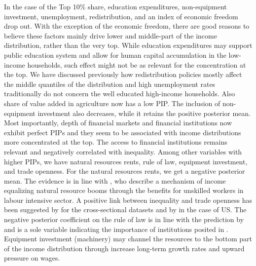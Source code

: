 \begin{refsection}
In the case of the Top 10\% share, education expenditures, non-equipment investment, unemployment, redistribution, and an index of economic freedom drop out. With the exception of the economic freedom, there are good reasons to believe these factors mainly drive lower and middle-part of the income distribution, rather than the very top. While education expenditures may support public education system and allow for human capital accumulation in the low-income households, such effect might not be as relevant for the concentration at the top. We have discussed previously how redistribution policies mostly affect the middle quantiles of the distribution and high unemployment rates traditionally do not concern the well educated high-income households. Also share of value added in agriculture now has a low \ac{PIP}. The inclusion of non-equipment investment also decreases, while it retains the positive posterior mean. Most importantly, depth of financial markets and financial institutions now exhibit perfect \acp{PIP} and they seem to be associated with income distributions more concentrated at the top. The access to financial institutions remains relevant and negatively correlated with inequality. Among other variables with higher \acp{PIP}, we have natural resources rents, rule of law, equipment investment, and trade openness. For the natural resources rents, we get a negative posterior mean. The evidence is in line with \textcite{goderismalone2011}, who describe a mechanism of income equalizing natural resource booms through the benefits for unskilled workers in labour intensive sector. A positive link between inequality and trade openness has been suggested by \textcite{Jaumotte2013,dabla2015causes} for the cross-sectional datasets and by \textcite{milanovicvan2018inequality} in the case of \ac{US}. The negative posterior coefficient on the rule of law is in line with the prediction by \textcite{perotti2007investor} and is a sole variable indicating the importance of institutions posited in \textcite{acemoglu2003cross,acemoglu2015rise}. Equipment investment (machinery) may channel the resources to the bottom part of the income distribution through increase long-term growth rates and upward pressure on wages.


\end{refsection}
